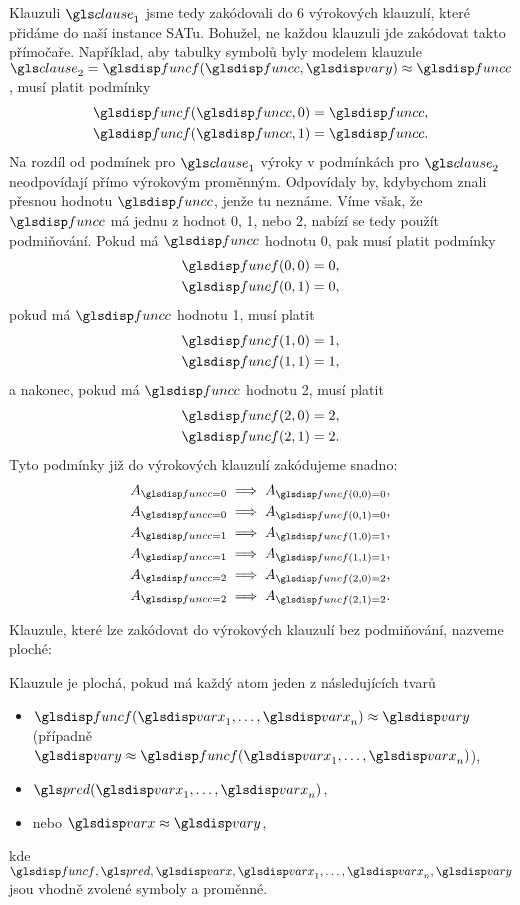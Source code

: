 Klauzuli $\clause_1$ jsme tedy zakódovali do 6 výrokových klauzulí,
které přidáme do naší instance SATu.
Bohužel, ne každou klauzuli jde zakódovat takto přímočaře.
Například, aby tabulky symbolů byly modelem klauzule
$\clause_2 = \func(\funcC, \varY) \approx \funcC$, musí platit podmínky
\begin{gather*}
  \func(\funcC, 0) = \funcC, \\
  \func(\funcC, 1) = \funcC.
\end{gather*}
Na rozdíl od podmínek pro $\clause_1$ výroky v podmínkách pro $\clause_2$
neodpovídají přímo výrokovým proměnným.
Odpovídaly by, kdybychom znali přesnou hodnotu $\funcC$, jenže tu neznáme.
Víme však, že $\funcC$ má jednu z hodnot 0, 1, nebo 2, nabízí se tedy
použít podmiňování. Pokud má $\funcC$ hodnotu 0, pak musí platit
podmínky
\begin{gather*}
  \func(0, 0) = 0, \\
  \func(0, 1) = 0,
\end{gather*}
pokud má $\funcC$ hodnotu 1, musí platit
\begin{gather*}
  \func(1, 0) = 1, \\
  \func(1, 1) = 1,
\end{gather*}
a nakonec, pokud má $\funcC$ hodnotu 2, musí platit
\begin{gather*}
  \func(2, 0) = 2, \\
  \func(2, 1) = 2.
\end{gather*}
Tyto podmínky již do výrokových klauzulí zakódujeme snadno:
\begin{gather*}
  A_{\funcC = 0} \implies A_{\func(0, 0) = 0}, \\
  A_{\funcC = 0} \implies A_{\func(0, 1) = 0}, \\
  A_{\funcC = 1} \implies A_{\func(1, 0) = 1}, \\
  A_{\funcC = 1} \implies A_{\func(1, 1) = 1}, \\
  A_{\funcC = 2} \implies A_{\func(2, 0) = 2}, \\
  A_{\funcC = 2} \implies A_{\func(2, 1) = 2}.
\end{gather*}

Klauzule, které lze zakódovat do výrokových klauzulí
bez podmiňování, nazveme ploché:

\begin{defn}
Klauzule je plochá, pokud má každý atom jeden z následujících tvarů
\begin{itemize}
\item $\func(\var_1 \comdots \var_n) \approx \varY$
  (případně $\varY \approx \func(\var_1 \comdots \var_n)$),
\item $\pred(\var_1 \comdots \var_n)$,
\item nebo $\var \approx \varY$,
\end{itemize}
kde $\func, \pred, \var, \var_1 \comdots \var_n, \varY$ jsou
vhodně zvolené symboly a proměnné.
\end{defn}

